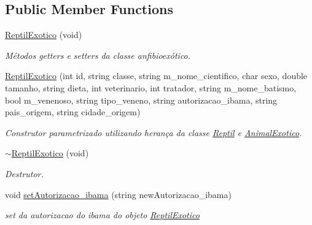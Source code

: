 \subsection*{Public Member Functions}
\begin{DoxyCompactItemize}
\item 
\mbox{\label{class_reptil_exotico_abe196e8bc7c2650b409383303755f3d3}} 
\mbox{\hyperlink{class_reptil_exotico_abe196e8bc7c2650b409383303755f3d3}{Reptil\+Exotico}} (void)
\begin{DoxyCompactList}\small\item\em Métodos getters e setters da classe anfibioexótico. \end{DoxyCompactList}\item 
\mbox{\label{class_reptil_exotico_aea075893c2cb88efc0163558dfd3f86c}} 
\mbox{\hyperlink{class_reptil_exotico_aea075893c2cb88efc0163558dfd3f86c}{Reptil\+Exotico}} (int id, string classe, string m\+\_\+nome\+\_\+cientifico, char sexo, double tamanho, string dieta, int veterinario, int tratador, string m\+\_\+nome\+\_\+batismo, bool m\+\_\+venenoso, string tipo\+\_\+veneno, string autorizacao\+\_\+ibama, string pais\+\_\+origem, string cidade\+\_\+origem)
\begin{DoxyCompactList}\small\item\em Construtor parametrizado utilizando herança da classe \mbox{\hyperlink{class_reptil}{Reptil}} e \mbox{\hyperlink{class_animal_exotico}{Animal\+Exotico}}. \end{DoxyCompactList}\item 
\mbox{\label{class_reptil_exotico_a25f04457519bc23977f79ce863f25e9d}} 
\mbox{\hyperlink{class_reptil_exotico_a25f04457519bc23977f79ce863f25e9d}{$\sim$\+Reptil\+Exotico}} (void)
\begin{DoxyCompactList}\small\item\em Destrutor. \end{DoxyCompactList}\item 
void \mbox{\hyperlink{class_reptil_exotico_ad53187fb7660b938ab84d7461c06c811}{set\+Autorizacao\+\_\+ibama}} (string new\+Autorizacao\+\_\+ibama)
\begin{DoxyCompactList}\small\item\em set da autorizacao do ibama do objeto \mbox{\hyperlink{class_reptil_exotico}{Reptil\+Exotico}} \end{DoxyCompactList}\item 

\end{DoxyCompactItemize}
